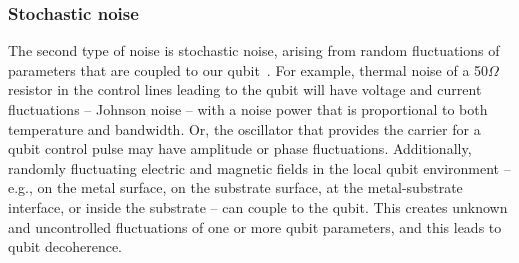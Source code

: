 \documentclass[aip,apr,twocolumn,showpacs,superscriptaddress,groupedaddress,nofootinbib,reprint]{revtex4-1}  %
\begin{document}
\subsubsection{Stochastic noise}

The second type of noise is stochastic noise, arising from random fluctuations of parameters that are coupled to our qubit~\cite{Ball2016}. For example, thermal noise of a 50$\Omega$ resistor in the control lines leading to the qubit will have voltage and current fluctuations -- Johnson noise -- with a noise power that is proportional to both temperature and bandwidth. Or, the oscillator that provides the carrier for a qubit control pulse may have amplitude or phase fluctuations. Additionally, randomly fluctuating electric and magnetic fields in the local qubit environment -- e.g., on the metal surface, on the substrate surface, at the metal-substrate interface, or inside the substrate -- can couple to the qubit. This creates unknown and uncontrolled fluctuations of one or more qubit parameters, and this leads to qubit decoherence.
\end{document}
